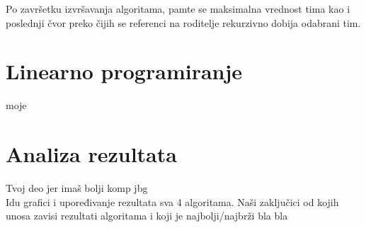 \documentclass[a4paper]{article}
\begin{document}
Po završetku izvršavanja algoritama, pamte se maksimalna vrednost tima kao i poslednji čvor preko čijih se referenci na roditelje rekurzivno dobija odabrani tim.






\section{Linearno programiranje}
moje
\section{Analiza rezultata}
Tvoj deo jer imaš bolji komp jbg \\
Idu grafici i upoređivanje rezultata sva 4 algoritama.
Naši zaključici od kojih unosa zavisi rezultati algoritama i koji je najbolji/najbrži bla bla

\appendix
 


\appendix
\end{document}
